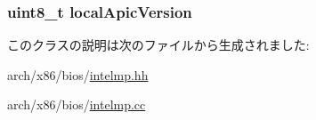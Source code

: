 \label{classX86ISA_1_1IntelMP_1_1Processor_a10016e4c89b2d8f761a40db4325ea961}
\hypertarget{classX86ISA_1_1IntelMP_1_1Processor_a2e061a4431641c9848fe7302e8d24592}{
\subsubsection[{localApicVersion}]{\setlength{\rightskip}{0pt plus 5cm}uint8\_\-t {\bf localApicVersion}}}
\label{classX86ISA_1_1IntelMP_1_1Processor_a2e061a4431641c9848fe7302e8d24592}


このクラスの説明は次のファイルから生成されました:\begin{DoxyCompactItemize}
\item 
arch/x86/bios/\hyperlink{intelmp_8hh}{intelmp.hh}\item 
arch/x86/bios/\hyperlink{intelmp_8cc}{intelmp.cc}\end{DoxyCompactItemize}
